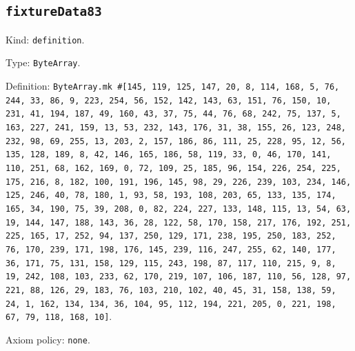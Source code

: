 \documentclass[11pt]{article}
\begin{document}
\subsection*{\texttt{fixtureData83}}
\noindent Kind: \texttt{definition}.\par
\noindent Type: \texttt{ByteArray}.\par
\noindent Definition: \texttt{ByteArray.mk \#[145, 119, 125, 147, 20, 8, 114, 168, 5, 76, 244, 33, 86, 9, 223, 254, 56, 152, 142, 143, 63, 151, 76, 150, 10, 231, 41, 194, 187, 49, 160, 43, 37, 75, 44, 76, 68, 242, 75, 137, 5, 163, 227, 241, 159, 13, 53, 232, 143, 176, 31, 38, 155, 26, 123, 248, 232, 98, 69, 255, 13, 203, 2, 157, 186, 86, 111, 25, 228, 95, 12, 56, 135, 128, 189, 8, 42, 146, 165, 186, 58, 119, 33, 0, 46, 170, 141, 110, 251, 68, 162, 169, 0, 72, 109, 25, 185, 96, 154, 226, 254, 225, 175, 216, 8, 182, 100, 191, 196, 145, 98, 29, 226, 239, 103, 234, 146, 125, 246, 40, 78, 180, 1, 93, 58, 193, 108, 203, 65, 133, 135, 174, 165, 34, 190, 75, 39, 208, 0, 82, 224, 227, 133, 148, 115, 13, 54, 63, 19, 144, 147, 188, 143, 36, 28, 122, 58, 170, 158, 217, 176, 192, 251, 225, 165, 17, 252, 94, 137, 250, 129, 171, 238, 195, 250, 183, 252, 76, 170, 239, 171, 198, 176, 145, 239, 116, 247, 255, 62, 140, 177, 36, 171, 75, 131, 158, 129, 115, 243, 198, 87, 117, 110, 215, 9, 8, 19, 242, 108, 103, 233, 62, 170, 219, 107, 106, 187, 110, 56, 128, 97, 221, 88, 126, 29, 183, 76, 103, 210, 102, 40, 45, 31, 158, 138, 59, 24, 1, 162, 134, 134, 36, 104, 95, 112, 194, 221, 205, 0, 221, 198, 67, 79, 118, 168, 10]}.\par
\noindent Axiom policy: \texttt{none}.\par
\end{document}
